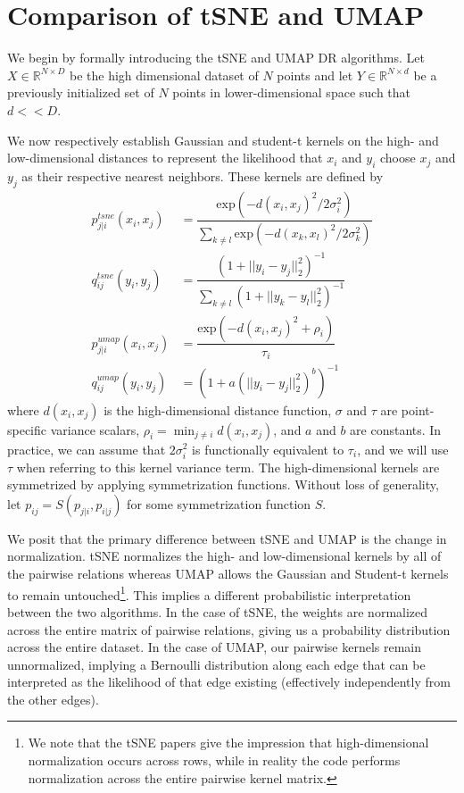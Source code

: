 \documentclass{article}
\theoremstyle{definition}
\begin{document}
\section{Comparison of tSNE and UMAP} \label{comparison}
We begin by formally introducing the tSNE and UMAP DR algorithms. Let $X \in \mathbb{R}^{N \times D}$ be the high dimensional dataset of $N$ points and let $Y
\in \mathbb{R}^{N \times d}$ be a previously initialized set of $N$ points in lower-dimensional space such that $d << D$. 

We now respectively establish Gaussian and student-t kernels on the high- and low-dimensional distances to represent the likelihood that $x_i$ and $y_i$ choose
$x_j$ and $y_j$ as their respective nearest neighbors. These kernels are defined by
\begin{align}
    p^{tsne}_{j|i}(x_i, x_j) &= \dfrac{\text{exp}(-d(x_i, x_j)^2 / 2 \sigma_i^2)}{\sum_{k \neq l} \text{exp}(-d(x_k, x_l)^2 / 2 \sigma_k^2)} \\[0.5ex]
    q^{tsne}_{ij}(y_i, y_j) &= \dfrac{(1 + ||y_i - y_j||^2_2)^{-1}}{\sum_{k \neq l} (1 + ||y_k - y_l||^2_2)^{-1}} \\[1.5ex]
    p^{umap}_{j|i}(x_i, x_j) &= \dfrac{\text{exp} (-d(x_i, x_j)^2 + \rho_{i})}{\tau_i} \\[0.3ex]
    q^{umap}_{ij}(y_i, y_j) &= \left( 1 + a(||y_i - y_j||^2_2)^b \right) ^{-1}
\end{align}
where $d(x_i, x_j)$ is the high-dimensional distance function, $\sigma$ and $\tau$ are point-specific variance scalars, $\rho_i = \min_{j \neq i} d(x_i, x_j)$,
and $a$ and $b$ are constants. In practice, we can assume that $2 \sigma_i^2$ is functionally equivalent to $\tau_i$, and we will use $\tau$ when referring to
this kernel variance term. The high-dimensional kernels are symmetrized by applying symmetrization functions. Without loss of generality, let $p_{ij}
= S(p_{j|i}, p_{i|j})$ for some symmetrization function $S$.

We posit that the primary difference between tSNE and UMAP is the change in normalization. tSNE normalizes the high- and low-dimensional kernels by all of the pairwise
relations whereas UMAP allows the Gaussian and Student-t kernels to remain untouched\footnote{We note that the tSNE papers give the impression that
high-dimensional normalization 
occurs across rows, while in reality the code performs normalization across the entire pairwise kernel matrix.}. This implies a different probabilistic
interpretation between the two algorithms. In the case of tSNE, the weights are normalized across the entire matrix of pairwise relations, giving us 
a probability distribution across the entire dataset. In the case of UMAP, our pairwise kernels remain unnormalized, implying a Bernoulli distribution along
each edge that can be interpreted as the likelihood of that edge existing (effectively independently from the other edges).
\end{document}
